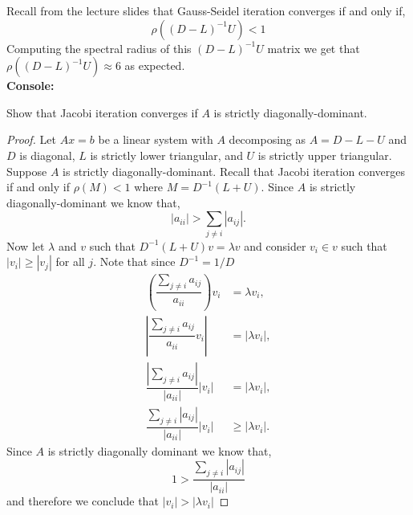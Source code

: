 \documentclass[12pt]{article}
\makeatletter
\theoremstyle{homework}
\newenvironment{exercise}[1]
{\def\@currentlabel{#1}\exercisecore}
{\endexercisecore}
\makeatother
\begin{document}
\begin{exercise}{Problem P13}
\begin{enumerate}
    Recall from the lecture slides that Gauss-Seidel iteration
    converges if and only if, 
    \begin{equation*}
      \rho((D - L)^{-1}U) < 1
    \end{equation*}
    Computing the spectral radius of this $(D - L)^{-1}U$ matrix we get that $\rho((D - L)^{-1}U) \approx 6$ as expected.\\
    
    \textbf{Console:}
    \begin{center}
      
    \end{center}
  \end{enumerate}
\end{exercise}
\vspace{1in}



\begin{exercise}{Problem P14} Show that Jacobi iteration converges if $A$ is strictly diagonally-dominant.
  \begin{proof} Let $Ax = b$ be a linear system with $A$ decomposing as $A = D - L - U$ and $D$ is diagonal, $L$ is 
    strictly lower triangular, and $U$ is strictly upper triangular. 
    Suppose $A$ is strictly diagonally-dominant. Recall that Jacobi iteration converges if and only if $\rho(M) < 1$
    where $M = D^{-1}(L + U)$. Since $A$ is strictly diagonally-dominant we know that,
    \begin{equation*}
      |a_{ii}|>\sum_{j \neq i} |a_{ij}|.
    \end{equation*}
    Now let $\lambda$ and $v$ such that $D^{-1}(L + U)v = \lambda v$ and 
    consider $v_i \in v$ such that $|v_i| \geq |v_j|$ for all $j$. Note that since $D^{-1} = 1/D$
    \begin{align*}
      \left(\dfrac{\sum_{j \neq i} a_{ij}}{a_{ii}}\right) v_i &=  \lambda v_i,\\
      \left|\dfrac{\sum_{j \neq i} a_{ij}}{a_{ii}} v_i\right| &=  |\lambda v_i|,\\
      \dfrac{\left|\sum_{j \neq i} a_{ij}\right|}{|a_{ii}|} |v_i| &=  |\lambda v_i|,\\
      \dfrac{\sum_{j \neq i} |a_{ij}|}{|a_{ii}|} |v_i| &\geq  |\lambda v_i|.
    \end{align*}
    Since $A$ is strictly diagonally dominant we know that, 
    \begin{equation*}
      1 > \dfrac{\sum_{j \neq i} |a_{ij}|}{|a_{ii}|}
    \end{equation*}
    and therefore we conclude that $|v_i| > |\lambda v_i|$


  \end{proof}
\end{exercise}
\vspace{1in}
\end{document}
